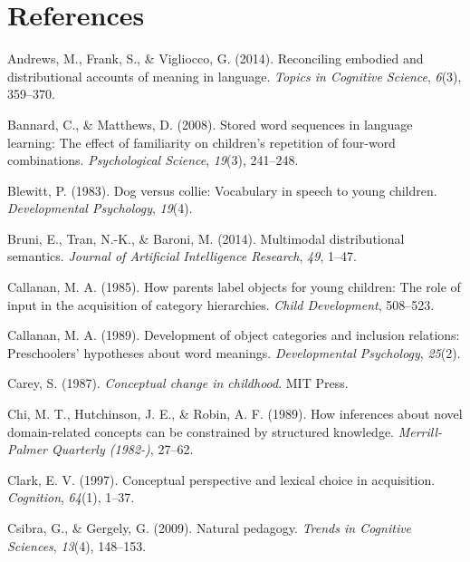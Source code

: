 \documentclass[english,,man,floatsintext]{apa6}
\begin{document}
\hypertarget{references}{%
\section{References}\label{references}}

\setlength{\parindent}{-0.5in}
\setlength{\leftskip}{0.5in}

\hypertarget{refs}{}
\leavevmode\hypertarget{ref-andrews2014}{}%
Andrews, M., Frank, S., \& Vigliocco, G. (2014). Reconciling embodied and distributional accounts of meaning in language. \emph{Topics in Cognitive Science}, \emph{6}(3), 359--370.

\leavevmode\hypertarget{ref-bannard2008}{}%
Bannard, C., \& Matthews, D. (2008). Stored word sequences in language learning: The effect of familiarity on children's repetition of four-word combinations. \emph{Psychological Science}, \emph{19}(3), 241--248.

\leavevmode\hypertarget{ref-blewitt1983}{}%
Blewitt, P. (1983). Dog versus collie: Vocabulary in speech to young children. \emph{Developmental Psychology}, \emph{19}(4).

\leavevmode\hypertarget{ref-bruni2014}{}%
Bruni, E., Tran, N.-K., \& Baroni, M. (2014). Multimodal distributional semantics. \emph{Journal of Artificial Intelligence Research}, \emph{49}, 1--47.

\leavevmode\hypertarget{ref-callanan1985}{}%
Callanan, M. A. (1985). How parents label objects for young children: The role of input in the acquisition of category hierarchies. \emph{Child Development}, 508--523.

\leavevmode\hypertarget{ref-callanan1989}{}%
Callanan, M. A. (1989). Development of object categories and inclusion relations: Preschoolers' hypotheses about word meanings. \emph{Developmental Psychology}, \emph{25}(2).

\leavevmode\hypertarget{ref-carey1987}{}%
Carey, S. (1987). \emph{Conceptual change in childhood}. MIT Press.

\leavevmode\hypertarget{ref-chi1989}{}%
Chi, M. T., Hutchinson, J. E., \& Robin, A. F. (1989). How inferences about novel domain-related concepts can be constrained by structured knowledge. \emph{Merrill-Palmer Quarterly (1982-)}, 27--62.

\leavevmode\hypertarget{ref-clark1997}{}%
Clark, E. V. (1997). Conceptual perspective and lexical choice in acquisition. \emph{Cognition}, \emph{64}(1), 1--37.

\leavevmode\hypertarget{ref-csibra2009}{}%
Csibra, G., \& Gergely, G. (2009). Natural pedagogy. \emph{Trends in Cognitive Sciences}, \emph{13}(4), 148--153.
\end{document}

